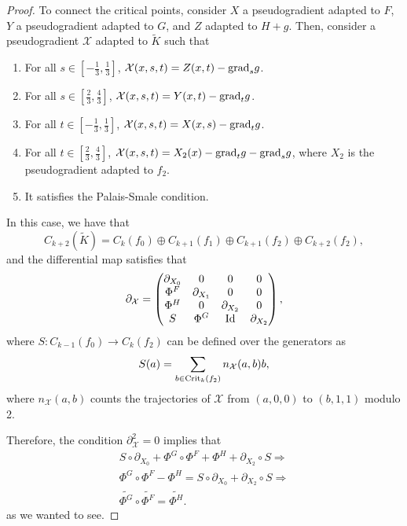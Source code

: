 \begin{proof}
To connect the critical points, consider $X$ a pseudogradient adapted to $F$, $Y$ a pseudogradient adapted to $G$, and $Z$ adapted to $H + g$. Then, consider a pseudogradient $\mathcal{X}$ adapted to $\tilde{K}$ such that

\begin{enumerate}
	\item For all $s \in \left[-\frac13,\frac13\right]$, $\mathcal{X}(x,s,t) = Z(x,t) - \mathrm{grad}_sg$.
	\item For all $s \in \left[\frac23,\frac43\right]$, $\mathcal{X}(x,s,t) = Y(x,t) - \mathrm{grad}_tg$.
	\item For all $t \in \left[-\frac13,\frac13\right]$, $\mathcal{X}(x,s,t) = X(x,s) - \mathrm{grad}_tg$.
	\item For all $t \in \left[\frac23,\frac43\right]$, $\mathcal{X}(x,s,t) = X_2(x) - \mathrm{grad}_tg - \mathrm{grad}_sg$, where $X_2$ is the pseudogradient adapted to $f_2$.
	\item It satisfies the Palais-Smale condition.
\end{enumerate}

In this case, we have that
\begin{displaymath}
C_{k+2}(\tilde{K}) = C_k(f_0) \oplus C_{k+1}(f_1) \oplus C_{k+1}(f_2) \oplus C_{k+2}(f_2) ,
\end{displaymath}
and the differential map satisfies that
\begin{displaymath}
\partial_{\mathcal{X}} = \begin{pmatrix} \partial_{X_0} & 0 & 0 & 0 \\ \Phi^F & \partial_{X_1} & 0 & 0 \\ \Phi^H & 0 & \partial_{X_2} & 0 \\ S & \Phi^G & \mathrm{Id} & \partial_{X_2} \end{pmatrix} ,
\end{displaymath}
where $S : C_{k-1}(f_0) \longrightarrow C_k(f_2)$ can be defined over the generators as
\begin{displaymath}
S(a) = \sum_{b \in \mathrm{Crit}_k(f_2)} n_{\mathcal{X}}(a,b) b ,
\end{displaymath}
where $n_{\mathcal{X}}(a,b)$ counts the trajectories of $\mathcal{X}$ from $(a,0,0)$ to $(b,1,1)$ modulo 2.

Therefore, the condition $\partial_{\mathcal{X}}^2 = 0$ implies that
\begin{eqnarray*}
S \circ \partial_{X_0} + \Phi^G \circ \Phi^F + \Phi^H + \partial_{X_2} \circ S \Rightarrow \\
\Phi^G \circ \Phi^F - \Phi^H = S \circ \partial_{X_0} + \partial_{X_2} \circ S \Rightarrow \\
\widetilde{\Phi^G} \circ \widetilde{\Phi^F} = \widetilde{\Phi^H} .
\end{eqnarray*}
as we wanted to see.


\end{proof}
